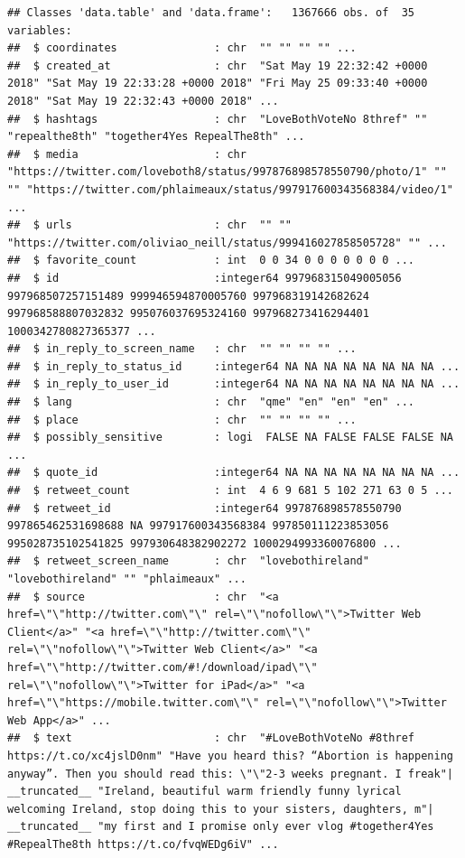 \documentclass[
]{book}
\begin{document}
\begin{verbatim}
## Classes 'data.table' and 'data.frame':   1367666 obs. of  35 variables:
##  $ coordinates               : chr  "" "" "" "" ...
##  $ created_at                : chr  "Sat May 19 22:32:42 +0000 2018" "Sat May 19 22:33:28 +0000 2018" "Fri May 25 09:33:40 +0000 2018" "Sat May 19 22:32:43 +0000 2018" ...
##  $ hashtags                  : chr  "LoveBothVoteNo 8thref" "" "repealthe8th" "together4Yes RepealThe8th" ...
##  $ media                     : chr  "https://twitter.com/loveboth8/status/997876898578550790/photo/1" "" "" "https://twitter.com/phlaimeaux/status/997917600343568384/video/1" ...
##  $ urls                      : chr  "" "" "https://twitter.com/oliviao_neill/status/999416027858505728" "" ...
##  $ favorite_count            : int  0 0 34 0 0 0 0 0 0 0 ...
##  $ id                        :integer64 997968315049005056 997968507257151489 999946594870005760 997968319142682624 997968588807032832 995076037695324160 997968273416294401 1000342780827365377 ... 
##  $ in_reply_to_screen_name   : chr  "" "" "" "" ...
##  $ in_reply_to_status_id     :integer64 NA NA NA NA NA NA NA NA ... 
##  $ in_reply_to_user_id       :integer64 NA NA NA NA NA NA NA NA ... 
##  $ lang                      : chr  "qme" "en" "en" "en" ...
##  $ place                     : chr  "" "" "" "" ...
##  $ possibly_sensitive        : logi  FALSE NA FALSE FALSE FALSE NA ...
##  $ quote_id                  :integer64 NA NA NA NA NA NA NA NA ... 
##  $ retweet_count             : int  4 6 9 681 5 102 271 63 0 5 ...
##  $ retweet_id                :integer64 997876898578550790 997865462531698688 NA 997917600343568384 997850111223853056 995028735102541825 997930648382902272 1000294993360076800 ... 
##  $ retweet_screen_name       : chr  "lovebothireland" "lovebothireland" "" "phlaimeaux" ...
##  $ source                    : chr  "<a href=\"\"http://twitter.com\"\" rel=\"\"nofollow\"\">Twitter Web Client</a>" "<a href=\"\"http://twitter.com\"\" rel=\"\"nofollow\"\">Twitter Web Client</a>" "<a href=\"\"http://twitter.com/#!/download/ipad\"\" rel=\"\"nofollow\"\">Twitter for iPad</a>" "<a href=\"\"https://mobile.twitter.com\"\" rel=\"\"nofollow\"\">Twitter Web App</a>" ...
##  $ text                      : chr  "#LoveBothVoteNo #8thref https://t.co/xc4jslD0nm" "Have you heard this? “Abortion is happening anyway”. Then you should read this: \"\"2-3 weeks pregnant. I freak"| __truncated__ "Ireland, beautiful warm friendly funny lyrical welcoming Ireland, stop doing this to your sisters, daughters, m"| __truncated__ "my first and I promise only ever vlog #together4Yes #RepealThe8th https://t.co/fvqWEDg6iV" ...

\end{verbatim}
\end{document}
